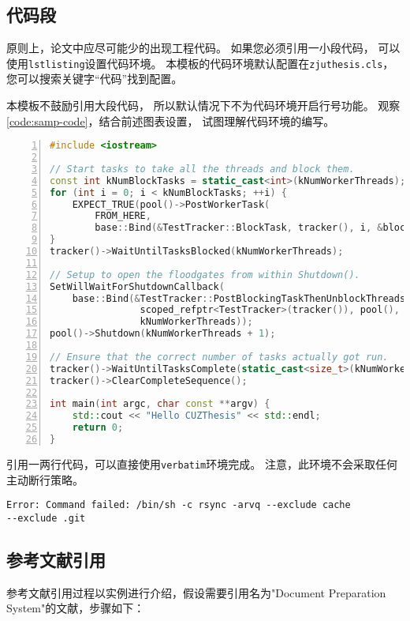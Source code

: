 \subsection{代码段}

原则上，论文中应尽可能少的出现工程代码。
如果您必须引用一小段代码，
可以使用\texttt{lstlisting}设置代码环境。
本模板的代码环境默认配置在\texttt{zjuthesis.cls}，
您可以搜索关键字“代码”找到配置。

本模板不鼓励引用大段代码，
所以默认情况下不为代码环境开启行号功能。
观察\autoref{code:samp-code}，结合前述图表设置，
试图理解代码环境的编写。

\begin{lstlisting}[language=C++,numbers=left, numberstyle=\tiny,label=code:samp-code, caption=一段Chromium的源代码]
#include <iostream>

// Start tasks to take all the threads and block them.
const int kNumBlockTasks = static_cast<int>(kNumWorkerThreads);
for (int i = 0; i < kNumBlockTasks; ++i) {
    EXPECT_TRUE(pool()->PostWorkerTask(
        FROM_HERE,
        base::Bind(&TestTracker::BlockTask, tracker(), i, &blocker)));
}
tracker()->WaitUntilTasksBlocked(kNumWorkerThreads);

// Setup to open the floodgates from within Shutdown().
SetWillWaitForShutdownCallback(
    base::Bind(&TestTracker::PostBlockingTaskThenUnblockThreads,
                scoped_refptr<TestTracker>(tracker()), pool(), &blocker,
                kNumWorkerThreads));
pool()->Shutdown(kNumWorkerThreads + 1);

// Ensure that the correct number of tasks actually got run.
tracker()->WaitUntilTasksComplete(static_cast<size_t>(kNumWorkerThreads + 1));
tracker()->ClearCompleteSequence();

int main(int argc, char const **argv) {
    std::cout << "Hello CUZThesis" << std::endl;
    return 0;
}
\end{lstlisting}

引用一两行代码，可以直接使用\texttt{verbatim}环境完成。
注意，此环境不会采取任何主动断行策略。
\begin{verbatim}
Error: Command failed: /bin/sh -c rsync -arvq --exclude cache
--exclude .git 
\end{verbatim}

\subsection{参考文献引用}

参考文献引用过程以实例进行介绍，假设需要引用名为"Document Preparation System"的文献，步骤如下：

